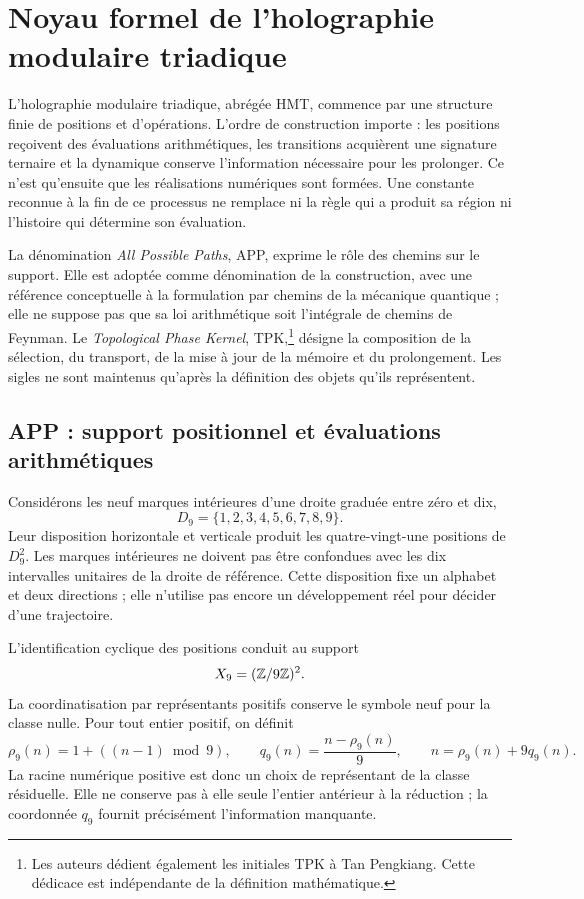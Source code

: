 \section{Noyau formel de l'holographie modulaire triadique}
\label{sec:nucleo}

L'holographie modulaire triadique, abrégée HMT, commence par une structure finie de positions et d'opérations. L'ordre de construction importe : les positions reçoivent des évaluations arithmétiques, les transitions acquièrent une signature ternaire et la dynamique conserve l'information nécessaire pour les prolonger. Ce n'est qu'ensuite que les réalisations numériques sont formées. Une constante reconnue à la fin de ce processus ne remplace ni la règle qui a produit sa région ni l'histoire qui détermine son évaluation.

La dénomination \emph{All Possible Paths}, APP, exprime le rôle des chemins sur le support. Elle est adoptée comme dénomination de la construction, avec une référence conceptuelle à la formulation par chemins de la mécanique quantique ; elle ne suppose pas que sa loi arithmétique soit l'intégrale de chemins de Feynman. Le \emph{Topological Phase Kernel}, TPK,\footnote{Les auteurs dédient également les initiales TPK à Tan Pengkiang. Cette dédicace est indépendante de la définition mathématique.} désigne la composition de la sélection, du transport, de la mise à jour de la mémoire et du prolongement. Les sigles ne sont maintenus qu'après la définition des objets qu'ils représentent.

\subsection{APP : support positionnel et évaluations arithmétiques}
\label{subsec:nucleo-app}

Considérons les neuf marques intérieures d'une droite graduée entre zéro et dix,
\[
 D_9=\{1,2,3,4,5,6,7,8,9\}.
\]
Leur disposition horizontale et verticale produit les quatre-vingt-une positions de \(D_9^2\). Les marques intérieures ne doivent pas être confondues avec les dix intervalles unitaires de la droite de référence. Cette disposition fixe un alphabet et deux directions ; elle n'utilise pas encore un développement réel pour décider d'une trajectoire.

L'identification cyclique des positions conduit au support
\[
 X_9=(\mathbb Z/9\mathbb Z)^2.
\]
La coordinatisation par représentants positifs conserve le symbole neuf pour la classe nulle. Pour tout entier positif, on définit
\begin{equation}
 \rho_9(n)=1+((n-1)\bmod9),\qquad
 q_9(n)=\frac{n-\rho_9(n)}9,
 \qquad n=\rho_9(n)+9q_9(n).
 \label{eq:residuo-cociente}
\end{equation}
La racine numérique positive est donc un choix de représentant de la classe résiduelle. Elle ne conserve pas à elle seule l'entier antérieur à la réduction ; la coordonnée \(q_9\) fournit précisément l'information manquante.


